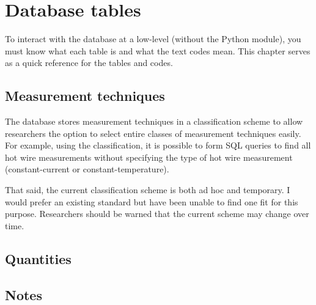 %
\chapter{Database tables}

To interact with the database at a low-level (without the Python module), you
must know what each table is and what the text codes mean.  This chapter serves
as a quick reference for the tables and codes.


\section{Measurement techniques}

The database stores measurement techniques in a classification scheme to allow
researchers the option to select entire classes of measurement techniques
easily.  For example, using the classification, it is possible to form SQL
queries to find all hot wire measurements without specifying the type of hot
wire measurement (constant-current or constant-temperature).

That said, the current classification scheme is both ad hoc and temporary.  I
would prefer an existing standard but have been unable to find one fit for this
purpose.  Researchers should be warned that the current scheme may change over
time.




\section{Quantities}




\section{Notes}


